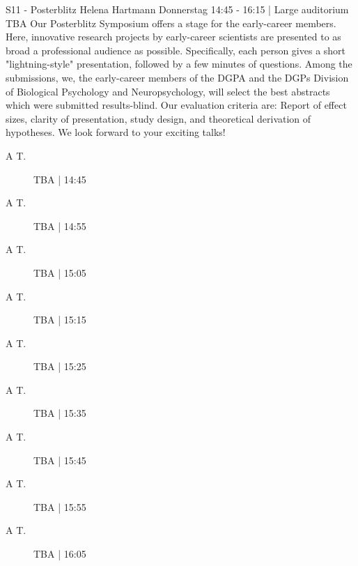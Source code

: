 
            \begin{symposium}
            {S11 - Posterblitz}
            {Helena Hartmann}
            {Donnerstag 14:45 - 16:15 | Large auditorium}
            {TBA}
            Our Posterblitz Symposium offers a stage for the early-career members. Here, innovative research projects by early-career scientists are presented to as broad a professional audience as possible. Specifically, each person gives a short "lightning-style" presentation, followed by a few minutes of questions. Among the submissions, we, the early-career members of the DGPA and the DGPs Division of Biological Psychology and Neuropsychology, will select the best abstracts which were submitted results-blind. Our evaluation criteria are: Report of effect sizes, clarity of presentation, study design, and theoretical derivation of hypotheses. We look forward to your exciting talks! 
            \begin{description}    
            
                \item [A T.] TBA \textcolor{mygray}{ | 14:45}    
                
                \item [A T.] TBA \textcolor{mygray}{ | 14:55}    
                
                \item [A T.] TBA \textcolor{mygray}{ | 15:05}    
                
                \item [A T.] TBA \textcolor{mygray}{ | 15:15}    
                
                \item [A T.] TBA \textcolor{mygray}{ | 15:25}    
                
                \item [A T.] TBA \textcolor{mygray}{ | 15:35}    
                
                \item [A T.] TBA \textcolor{mygray}{ | 15:45}    
                
                \item [A T.] TBA \textcolor{mygray}{ | 15:55}    
                
                \item [A T.] TBA \textcolor{mygray}{ | 16:05}    
                
            \end{description} 
            \end{symposium}
            